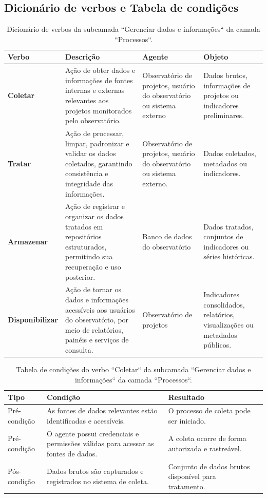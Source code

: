 \begin{apendicesenv}
\section{Dicionário de verbos e Tabela de condições}

\begin{table}[H]
\centering
\caption{Dicionário de verbos da subcamada ``Gerenciar dados e informações`` da camada ``Processos``.}
\begin{tabularx}{\textwidth}{|l|X|X|X|}
\hline
\textbf{Verbo} & \textbf{Descrição} & \textbf{Agente} & \textbf{Objeto} \\ \hline
\textbf{Coletar} & Ação de obter dados e informações de fontes internas e externas relevantes aos projetos monitorados pelo observatório. & Observatório de projetos, usuário do observatório ou sistema externo & Dados brutos, informações de projetos ou indicadores preliminares. \\ \hline
\textbf{Tratar} & Ação de processar, limpar, padronizar e validar os dados coletados, garantindo consistência e integridade das informações. & Observatório de projetos, usuário do observatório ou sistema externo. & Dados coletados, metadados ou indicadores.\\ \hline
\textbf{Armazenar} & Ação de registrar e organizar os dados tratados em repositórios estruturados, permitindo sua recuperação e uso posterior. & Banco de dados do observatório & Dados tratados, conjuntos de indicadores ou séries históricas. \\ \hline
\textbf{Disponibilizar} & Ação de tornar os dados e informações acessíveis aos usuários do observatório, por meio de relatórios, painéis e serviços de consulta. & Observatório de projetos & Indicadores consolidados, relatórios, visualizações ou metadados públicos. \\ \hline
\end{tabularx}
\end{table}

\begin{table}[H]
\centering
\caption{Tabela de condições do verbo ``Coletar`` da subcamada ``Gerenciar dados e informações`` da camada ``Processos``.}
\begin{tabularx}{\textwidth}{|l|X|X|X|}
\hline
\textbf{Tipo} & \textbf{Condição} & \textbf{Resultado} \\ \hline
Pré-condição & As fontes de dados relevantes estão identificadas e acessíveis. &  O processo de coleta pode ser iniciado.\\ \hline
Pré-condição & O agente possui credenciais e permissões válidas para acessar as fontes de dados. &  A coleta ocorre de forma autorizada e rastreável.\\ \hline
Pós-condição & Dados brutos são capturados e registrados no sistema de coleta. &  Conjunto de dados brutos disponível para tratamento.\\ \hline
\end{tabularx}
\end{table}


\end{apendicesenv}
